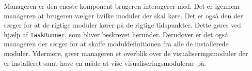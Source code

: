 Manageren er den eneste komponent brugeren interagerer med.
Det er igennem manageren at brugeren vælger hvilke moduler der skal køre.
Det er også den der sørger for at de rigtige moduler kører på de rigtige tidspunkter.
Dette gøres ved hjælp af \texttt{TaskRunner}, som bliver beskrevet herunder.
Derudover er det også manageren der sørger for at skaffe moduldefinitionen fra alle de installerede moduler.
Ydermere, giver manageren et overblik over de visualiseringsmoduler der er installeret samt have en måde at vise visualiseringsmodulerne på.